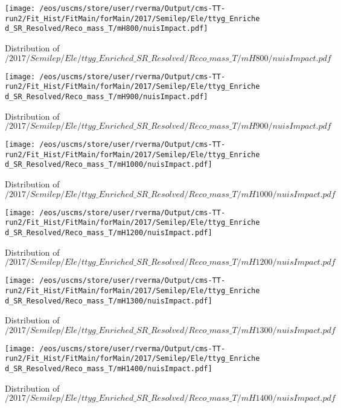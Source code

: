 \begin{figure}
\centering
\texttt{[image: /eos/uscms/store/user/rverma/Output/cms-TT-run2/Fit\_Hist/FitMain/forMain/2017/Semilep/Ele/ttyg\_Enriched\_SR\_Resolved/Reco\_mass\_T/mH800/nuisImpact.pdf]}
\caption{Distribution of $/2017/Semilep/Ele/ttyg\_Enriched\_SR\_Resolved/Reco\_mass\_T/mH800/nuisImpact.pdf$}
\end{figure}

\begin{figure}
\centering
\texttt{[image: /eos/uscms/store/user/rverma/Output/cms-TT-run2/Fit\_Hist/FitMain/forMain/2017/Semilep/Ele/ttyg\_Enriched\_SR\_Resolved/Reco\_mass\_T/mH900/nuisImpact.pdf]}
\caption{Distribution of $/2017/Semilep/Ele/ttyg\_Enriched\_SR\_Resolved/Reco\_mass\_T/mH900/nuisImpact.pdf$}
\end{figure}

\begin{figure}
\centering
\texttt{[image: /eos/uscms/store/user/rverma/Output/cms-TT-run2/Fit\_Hist/FitMain/forMain/2017/Semilep/Ele/ttyg\_Enriched\_SR\_Resolved/Reco\_mass\_T/mH1000/nuisImpact.pdf]}
\caption{Distribution of $/2017/Semilep/Ele/ttyg\_Enriched\_SR\_Resolved/Reco\_mass\_T/mH1000/nuisImpact.pdf$}
\end{figure}

\begin{figure}
\centering
\texttt{[image: /eos/uscms/store/user/rverma/Output/cms-TT-run2/Fit\_Hist/FitMain/forMain/2017/Semilep/Ele/ttyg\_Enriched\_SR\_Resolved/Reco\_mass\_T/mH1200/nuisImpact.pdf]}
\caption{Distribution of $/2017/Semilep/Ele/ttyg\_Enriched\_SR\_Resolved/Reco\_mass\_T/mH1200/nuisImpact.pdf$}
\end{figure}

\begin{figure}
\centering
\texttt{[image: /eos/uscms/store/user/rverma/Output/cms-TT-run2/Fit\_Hist/FitMain/forMain/2017/Semilep/Ele/ttyg\_Enriched\_SR\_Resolved/Reco\_mass\_T/mH1300/nuisImpact.pdf]}
\caption{Distribution of $/2017/Semilep/Ele/ttyg\_Enriched\_SR\_Resolved/Reco\_mass\_T/mH1300/nuisImpact.pdf$}
\end{figure}

\begin{figure}
\centering
\texttt{[image: /eos/uscms/store/user/rverma/Output/cms-TT-run2/Fit\_Hist/FitMain/forMain/2017/Semilep/Ele/ttyg\_Enriched\_SR\_Resolved/Reco\_mass\_T/mH1400/nuisImpact.pdf]}
\caption{Distribution of $/2017/Semilep/Ele/ttyg\_Enriched\_SR\_Resolved/Reco\_mass\_T/mH1400/nuisImpact.pdf$}
\end{figure}

